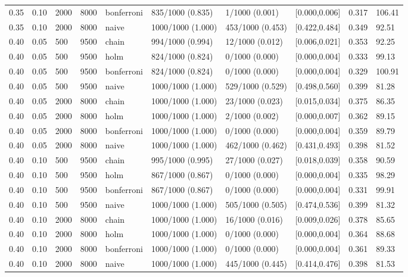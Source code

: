 \documentclass{ieeeaccess}
\begin{document}
\begin{table}[p]
\begin{tabular}{@{}llllllllll@{}}
0.35 & 0.10 & 2000 & 8000 & bonferroni & 835/1000 (0.835) & 1/1000 (0.001) & [0.000,0.006] & 0.317 & 106.41 \\
0.35 & 0.10 & 2000 & 8000 & naive & 1000/1000 (1.000) & 453/1000 (0.453) & [0.422,0.484] & 0.349 & 92.51 \\
0.40 & 0.05 & 500 & 9500 & chain & 994/1000 (0.994) & 12/1000 (0.012) & [0.006,0.021] & 0.353 & 92.25 \\
0.40 & 0.05 & 500 & 9500 & holm & 824/1000 (0.824) & 0/1000 (0.000) & [0.000,0.004] & 0.333 & 99.13 \\
0.40 & 0.05 & 500 & 9500 & bonferroni & 824/1000 (0.824) & 0/1000 (0.000) & [0.000,0.004] & 0.329 & 100.91 \\
0.40 & 0.05 & 500 & 9500 & naive & 1000/1000 (1.000) & 529/1000 (0.529) & [0.498,0.560] & 0.399 & 81.28 \\
0.40 & 0.05 & 2000 & 8000 & chain & 1000/1000 (1.000) & 23/1000 (0.023) & [0.015,0.034] & 0.375 & 86.35 \\
0.40 & 0.05 & 2000 & 8000 & holm & 1000/1000 (1.000) & 2/1000 (0.002) & [0.000,0.007] & 0.362 & 89.15 \\
0.40 & 0.05 & 2000 & 8000 & bonferroni & 1000/1000 (1.000) & 0/1000 (0.000) & [0.000,0.004] & 0.359 & 89.79 \\
0.40 & 0.05 & 2000 & 8000 & naive & 1000/1000 (1.000) & 462/1000 (0.462) & [0.431,0.493] & 0.398 & 81.52 \\
0.40 & 0.10 & 500 & 9500 & chain & 995/1000 (0.995) & 27/1000 (0.027) & [0.018,0.039] & 0.358 & 90.59 \\
0.40 & 0.10 & 500 & 9500 & holm & 867/1000 (0.867) & 0/1000 (0.000) & [0.000,0.004] & 0.335 & 98.29 \\
0.40 & 0.10 & 500 & 9500 & bonferroni & 867/1000 (0.867) & 0/1000 (0.000) & [0.000,0.004] & 0.331 & 99.91 \\
0.40 & 0.10 & 500 & 9500 & naive & 1000/1000 (1.000) & 505/1000 (0.505) & [0.474,0.536] & 0.399 & 81.32 \\
0.40 & 0.10 & 2000 & 8000 & chain & 1000/1000 (1.000) & 16/1000 (0.016) & [0.009,0.026] & 0.378 & 85.65 \\
0.40 & 0.10 & 2000 & 8000 & holm & 1000/1000 (1.000) & 0/1000 (0.000) & [0.000,0.004] & 0.364 & 88.68 \\
0.40 & 0.10 & 2000 & 8000 & bonferroni & 1000/1000 (1.000) & 0/1000 (0.000) & [0.000,0.004] & 0.361 & 89.33 \\
0.40 & 0.10 & 2000 & 8000 & naive & 1000/1000 (1.000) & 445/1000 (0.445) & [0.414,0.476] & 0.398 & 81.53 \\
\bottomrule
\end{tabular}
\end{table}
\endgroup
\end{document}
